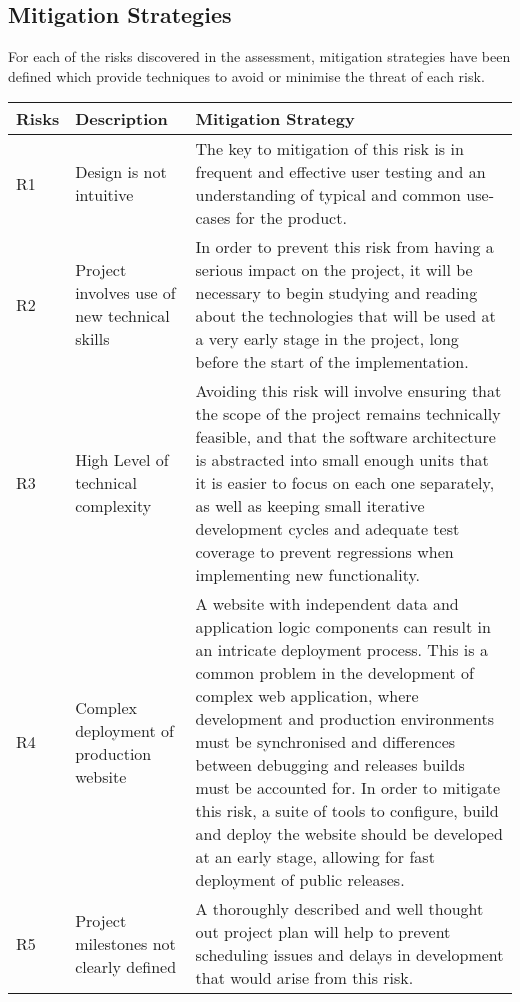 \subsection{Mitigation Strategies}

For each of the risks discovered in the assessment, mitigation strategies have
been defined which provide techniques to avoid or minimise the threat of each
risk.

\begin{table}[H]
\centering
\begin{tabular}{ | l | p{4cm} | p{12cm} | }
\hline
Risks & Description & Mitigation Strategy\\
\hline

R1 & Design is not intuitive & The key to mitigation of this risk is in frequent
and effective user testing and an understanding of typical and common use-cases
for the product.\\

R2 & Project involves use of new technical skills & In order to prevent this
risk from having a serious impact on the project, it will be necessary to begin
studying and reading about the technologies that will be used at a very early
stage in the project, long before the start of the implementation.\\

R3 & High Level of technical complexity & Avoiding this risk will involve
ensuring that the scope of the project remains technically feasible, and that
the software architecture is abstracted into small enough units that it is
easier to focus on each one separately, as well as keeping small iterative
development cycles and adequate test coverage to prevent regressions when
implementing new functionality.\\

R4 & Complex deployment of production website & A website with independent data
and application logic components can result in an intricate deployment
process. This is a common problem in the development of complex web application,
where development and production environments must be synchronised and
differences between debugging and releases builds must be accounted for. In
order to mitigate this risk, a suite of tools to configure, build and deploy the
website should be developed at an early stage, allowing for fast deployment of
public releases.\\

R5 & Project milestones not clearly defined & A thoroughly described and well
thought out project plan will help to prevent scheduling issues and delays in
development that would arise from this risk.\\

\hline
\end{tabular}
\end{table}

